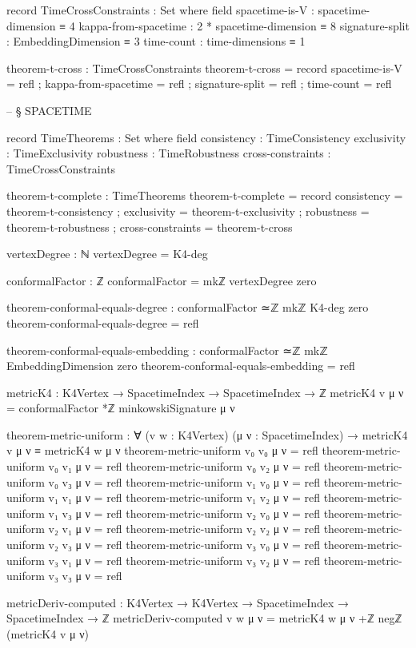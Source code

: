 \documentclass[11pt,a4paper]{book}
\begin{document}
\begin{code}
record TimeCrossConstraints : Set where
  field
    spacetime-is-V       : spacetime-dimension ≡ 4
    kappa-from-spacetime : 2 * spacetime-dimension ≡ 8
    signature-split      : EmbeddingDimension ≡ 3
    time-count           : time-dimensions ≡ 1

theorem-t-cross : TimeCrossConstraints
theorem-t-cross = record
  { spacetime-is-V       = refl
  ; kappa-from-spacetime = refl
  ; signature-split      = refl
  ; time-count           = refl
  }


-- § SPACETIME

record TimeTheorems : Set where
  field
    consistency       : TimeConsistency
    exclusivity       : TimeExclusivity
    robustness        : TimeRobustness
    cross-constraints : TimeCrossConstraints

theorem-t-complete : TimeTheorems
theorem-t-complete = record
  { consistency       = theorem-t-consistency
  ; exclusivity       = theorem-t-exclusivity
  ; robustness        = theorem-t-robustness
  ; cross-constraints = theorem-t-cross
  }


vertexDegree : ℕ
vertexDegree = K4-deg

conformalFactor : ℤ
conformalFactor = mkℤ vertexDegree zero

theorem-conformal-equals-degree : conformalFactor ≃ℤ mkℤ K4-deg zero
theorem-conformal-equals-degree = refl

theorem-conformal-equals-embedding : conformalFactor ≃ℤ mkℤ EmbeddingDimension zero
theorem-conformal-equals-embedding = refl

metricK4 : K4Vertex → SpacetimeIndex → SpacetimeIndex → ℤ
metricK4 v μ ν = conformalFactor *ℤ minkowskiSignature μ ν

theorem-metric-uniform : ∀ (v w : K4Vertex) (μ ν : SpacetimeIndex) →
  metricK4 v μ ν ≡ metricK4 w μ ν
theorem-metric-uniform v₀ v₀ μ ν = refl
theorem-metric-uniform v₀ v₁ μ ν = refl
theorem-metric-uniform v₀ v₂ μ ν = refl
theorem-metric-uniform v₀ v₃ μ ν = refl
theorem-metric-uniform v₁ v₀ μ ν = refl
theorem-metric-uniform v₁ v₁ μ ν = refl
theorem-metric-uniform v₁ v₂ μ ν = refl
theorem-metric-uniform v₁ v₃ μ ν = refl
theorem-metric-uniform v₂ v₀ μ ν = refl
theorem-metric-uniform v₂ v₁ μ ν = refl
theorem-metric-uniform v₂ v₂ μ ν = refl
theorem-metric-uniform v₂ v₃ μ ν = refl
theorem-metric-uniform v₃ v₀ μ ν = refl
theorem-metric-uniform v₃ v₁ μ ν = refl
theorem-metric-uniform v₃ v₂ μ ν = refl
theorem-metric-uniform v₃ v₃ μ ν = refl

metricDeriv-computed : K4Vertex → K4Vertex → SpacetimeIndex → SpacetimeIndex → ℤ
metricDeriv-computed v w μ ν = metricK4 w μ ν +ℤ negℤ (metricK4 v μ ν)


\end{code}
\end{document}
